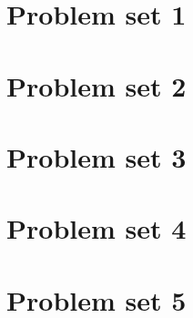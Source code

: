 \documentclass{article}
\newcommand{\addpset}[1]{
	\section{Problem set #1}
	
	\pagebreak
}
\begin{document}
\addpset{1}
\addpset{2}
\addpset{3}
\addpset{4}
\addpset{5}
\end{document}

